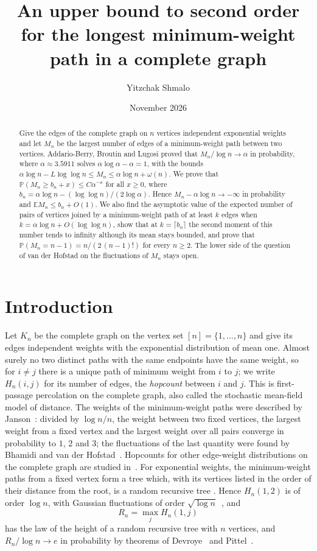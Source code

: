 \documentclass[11pt]{amsart}
\title[The longest minimum-weight path in a complete graph]{An upper bound to second order for the longest
minimum-weight path in a complete graph}
\author{Yitzchak Shmalo}
\date{November 2026}
\theoremstyle{definition}
\newcommand{\Prob}{\mathbb{P}}
\newcommand{\E}{\mathbb{E}}
\newcommand{\as}{\alpha}
\begin{document}
\begin{abstract}
Give the edges of the complete graph on $n$ vertices independent exponential weights and let $M_n$ be the largest
number of edges of a minimum-weight path between two vertices. Addario-Berry, Broutin and Lugosi proved that
$M_n/\log n\to\as$ in probability, where $\as\approx3.5911$ solves $\as\log\as-\as=1$, with the bounds
$\as\log n-L\log\log n\le M_n\le\as\log n+\omega(n)$. We prove that
$\Prob(M_n\ge b_n+x)\le C\as^{-x}$ for all $x\ge0$, where $b_n=\as\log n-(\log\log n)/(2\log\as)$. Hence
$M_n-\as\log n\to-\infty$ in probability and $\E M_n\le b_n+O(1)$. We also find the asymptotic value of the
expected number of pairs of vertices joined by a minimum-weight path of at least $k$ edges when
$k=\as\log n+O(\log\log n)$, show that at $k=\lceil b_n\rceil$ the second moment of this number tends to infinity
although its mean stays bounded, and prove that
$\Prob(M_n=n-1)=n/(2\,(n-1)!)$ for every $n\ge2$. The lower side of the question of van der Hofstad on the
fluctuations of $M_n$ stays open.
\end{abstract}
\maketitle

\section{Introduction}
Let $K_n$ be the complete graph on the vertex set $[n]=\{1,\dots,n\}$ and give its edges independent weights with the
exponential distribution of mean one. Almost surely no two distinct paths with the same endpoints have the same weight, so for $i\ne j$ there is a
unique path of minimum weight from $i$ to $j$; we write $H_n(i,j)$ for its number of edges, the \emph{hopcount}
between $i$ and $j$. This is first-passage percolation on the complete graph, also called the stochastic mean-field
model of distance. The weights of the minimum-weight paths were described by Janson~\cite{Janson}: divided by
$\log n/n$, the weight between two fixed vertices, the largest weight from a fixed vertex and the largest weight over
all pairs converge in probability to $1$, $2$ and $3$; the fluctuations of the last quantity were found by Bhamidi and
van der Hofstad~\cite{BvdH}. Hopcounts for other edge-weight distributions on the complete graph are studied
in~\cite{EGHN1,EGHN2}. For exponential weights, the minimum-weight paths from a fixed vertex form a tree which, with
its vertices listed in the order of their distance from the root, is a random recursive tree
\cite{vdHHVM,SM}. Hence $H_n(1,2)$ is of order $\log n$, with Gaussian fluctuations of order
$\sqrt{\log n}$~\cite{vdHHVM,HVM}, and
\[
R_n=\max_{j}H_n(1,j)
\]
has the law of the height of a random recursive tree with $n$ vertices, and $R_n/\log n\to e$ in probability by
theorems of Devroye~\cite{Devroye} and Pittel~\cite{Pittel}.
\end{document}
